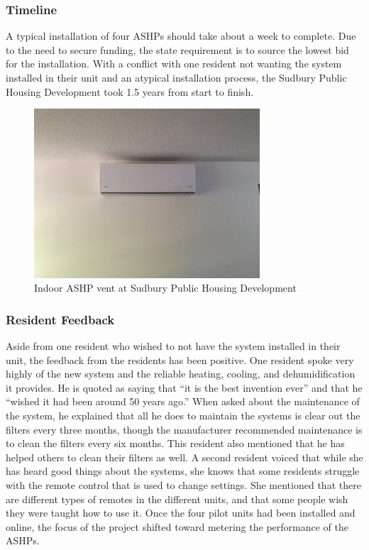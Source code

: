 \subsubsection{Timeline}
\par A typical installation of four ASHPs should take about a week to complete. Due to the need to secure funding, the state requirement is to source the lowest bid for the installation. With a conflict with one resident not wanting the system installed in their unit and an atypical installation process, the Sudbury Public Housing Development took 1.5 years from start to finish.
\begin{figure}[H]
\centering
\includegraphics[width=0.75\textwidth]{findingschapter/sudburyinsideunit}
\caption{Indoor ASHP vent at Sudbury Public Housing Development}
\label{fig:sudburyvents}
\end{figure}

\subsubsection{Resident Feedback}
\par Aside from one resident who wished to not have the system installed in their unit, the feedback from the residents has been positive. One resident spoke very highly of the new system and the reliable heating, cooling, and dehumidification it provides. He is quoted as saying that “it is the best invention ever” and that he “wished it had been around 50 years ago.” When asked about the maintenance of the system, he explained that all he does to maintain the systems is clear out the filters every three months, though the manufacturer recommended maintenance is to clean the filters every six months. This resident also mentioned that he has helped others to clean their filters as well. A second resident voiced that while she has heard good things about the systems, she knows that some residents struggle with the remote control that is used to change settings. She mentioned that there are different types of remotes in the different units, and that some people wish they were taught how to use it. Once the four pilot units had been installed and online, the focus of the project shifted toward metering the performance of the ASHPs.

